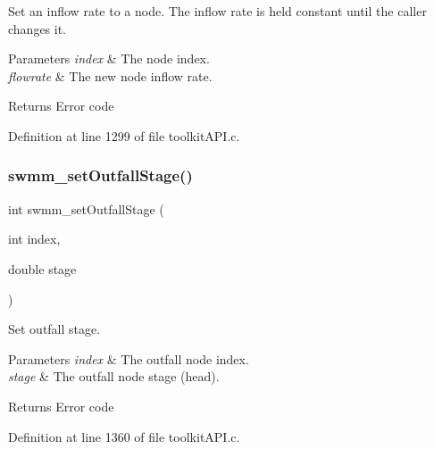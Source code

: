 Set an inflow rate to a node. The inflow rate is held constant until the caller changes it. 


\begin{DoxyParams}{Parameters}
{\em index} & The node index. \\
\hline
{\em flowrate} & The new node inflow rate. \\
\hline
\end{DoxyParams}
\begin{DoxyReturn}{Returns}
Error code 
\end{DoxyReturn}


Definition at line 1299 of file toolkit\+A\+P\+I.\+c.

\mbox{\label{group__tkfuncs_ga80d902400625073d8ff2c392365fde9b}} 
\subsubsection{\texorpdfstring{swmm\+\_\+set\+Outfall\+Stage()}{swmm\_setOutfallStage()}}
{\footnotesize\ttfamily int swmm\+\_\+set\+Outfall\+Stage (\begin{DoxyParamCaption}\item[{int}]{index,  }\item[{double}]{stage }\end{DoxyParamCaption})}



Set outfall stage. 


\begin{DoxyParams}{Parameters}
{\em index} & The outfall node index. \\
\hline
{\em stage} & The outfall node stage (head). \\
\hline
\end{DoxyParams}
\begin{DoxyReturn}{Returns}
Error code 
\end{DoxyReturn}


Definition at line 1360 of file toolkit\+A\+P\+I.\+c.

